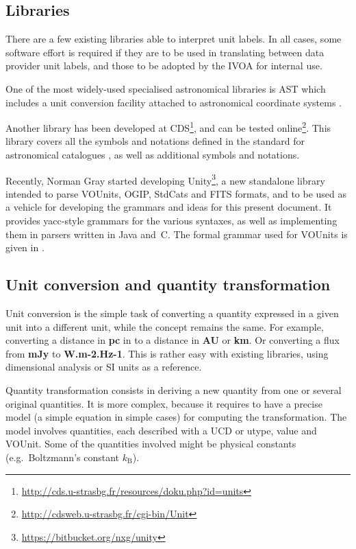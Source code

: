 \documentclass[12pt,notitlepage,onecolumn]{ivoa}
\def\eg{e.g.~}
\newcommand{\unit}[1]{\textbf{\textsf{\color{orange}#1}}}
\begin{document}
\subsection{Libraries\label{sec:libraries}}

There are a few existing libraries able to interpret unit labels.
In all cases,
some software effort is required if they are to be used in translating
between data provider unit labels, and those to be adopted by
the IVOA for internal use.

One of the most widely-used specialised
astronomical libraries is AST which includes a unit conversion
facility attached to astronomical coordinate systems \citep{berry12}.

Another library has been developed at
CDS\footnote{\url{http://cds.u-strasbg.fr/resources/doku.php?id=units}},
and can be tested online\footnote{\url{http://cdsweb.u-strasbg.fr/cgi-bin/Unit}}. This library covers all
the symbols and notations defined in the standard for astronomical catalogues \citep[\S3.2]{cds00}, as well as
additional symbols and notations.

Recently, Norman Gray started developing
Unity\footnote{\url{https://bitbucket.org/nxg/unity}}, a new
standalone library intended to parse VOUnits, OGIP, StdCats and FITS
formats, and to be used as a vehicle for developing the grammars and
ideas for this present document.  It provides yacc-style grammars for
the various syntaxes, as well as implementing them in parsers written
in Java and~C.  The formal grammar used for VOUnits is given in
.

\subsection{Unit conversion and quantity transformation\label{sec:conversion}}

Unit conversion is the simple task of converting a quantity expressed in a given unit into a different unit, while
the concept remains the same. For example, converting a distance in \unit{pc} in to a distance in \unit{AU} or \unit{km}.
Or converting a flux from \unit{mJy} to \unit{W.m-2.Hz-1}. This is rather easy with existing libraries, using dimensional
analysis or SI units as a reference.

Quantity transformation consists in deriving a new quantity from one or several original
quantities. It is more complex, because it requires to have a precise model 
(a simple equation in simple cases) for computing the transformation. The model involves
quantities, each described with a UCD or utype, value and VOUnit. Some of the quantities
involved might be physical constants (\eg  Boltzmann's constant $k_{\mathrm{B}}$).
\end{document}
